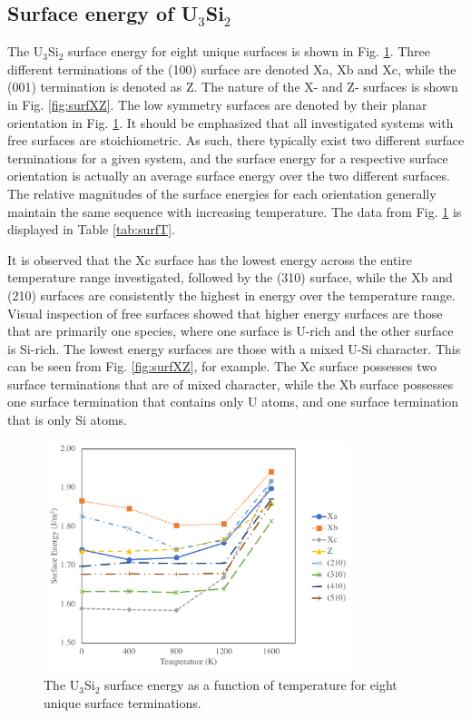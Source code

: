 \documentclass[review]{elsarticle}
\begin{document}
\FloatBarrier

\subsection{Surface energy of U$_{3}$Si$_{2}$}

The U$_{3}$Si$_{2}$ surface energy for eight unique surfaces is shown in Fig. \ref{fig:surfT}. Three different terminations of the (100) surface are denoted Xa, Xb and Xc, while the (001) termination is denoted as Z. The nature of the X- and Z- surfaces is shown in Fig. \ref{fig:surfXZ}. The low symmetry surfaces are denoted by their planar orientation in Fig. \ref{fig:surfT}. It should be emphasized that all investigated systems with free surfaces are stoichiometric. As such, there typically exist two different surface terminations for a given system, and the surface energy for a respective surface orientation is actually an average surface energy over the two different surfaces. The relative magnitudes of the surface energies for each orientation generally maintain the same sequence with increasing temperature. The data from Fig. \ref{fig:surfT} is displayed in Table \ref{tab:surfT}.

It is observed that the Xc surface has the lowest energy across the entire temperature range investigated, followed by the (310) surface, while the Xb and (210) surfaces are consistently the highest in energy over the temperature range. Visual inspection of free surfaces showed that higher energy surfaces are those that are primarily one species, where one surface is U-rich and the other surface is Si-rich. The lowest energy surfaces are those with a mixed U-Si character. This can be seen from Fig. \ref{fig:surfXZ}, for example. The Xc surface possesses two surface terminations that are of mixed character, while the Xb surface possesses one surface termination that contains only U atoms, and one surface termination that is only Si atoms. 

\begin{figure}[h]
 \centering
 \includegraphics[width=0.8\textwidth]{surf_vs_T.png} 
 \caption{The U$_{3}$Si$_{2}$ surface energy as a function of temperature for eight unique surface terminations. }
 \label{fig:surfT}
\end{figure}
\end{document}
